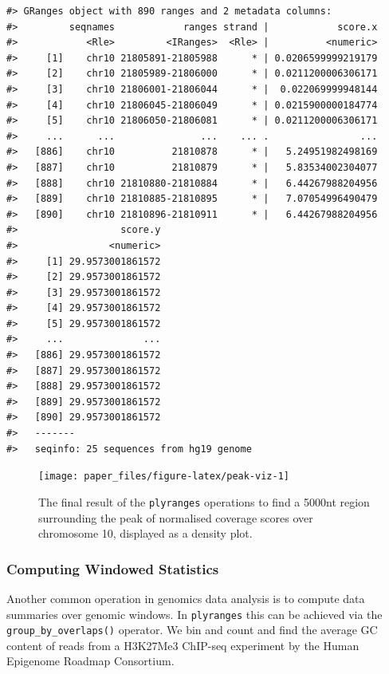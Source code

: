 \documentclass[]{article}
\begin{document}
\begin{verbatim}
#> GRanges object with 890 ranges and 2 metadata columns:
#>         seqnames            ranges strand |            score.x
#>            <Rle>         <IRanges>  <Rle> |          <numeric>
#>     [1]    chr10 21805891-21805988      * | 0.0206599999219179
#>     [2]    chr10 21805989-21806000      * | 0.0211200006306171
#>     [3]    chr10 21806001-21806044      * |  0.022069999948144
#>     [4]    chr10 21806045-21806049      * | 0.0215900000184774
#>     [5]    chr10 21806050-21806081      * | 0.0211200006306171
#>     ...      ...               ...    ... .                ...
#>   [886]    chr10          21810878      * |   5.24951982498169
#>   [887]    chr10          21810879      * |   5.83534002304077
#>   [888]    chr10 21810880-21810884      * |   6.44267988204956
#>   [889]    chr10 21810885-21810895      * |   7.07054996490479
#>   [890]    chr10 21810896-21810911      * |   6.44267988204956
#>                  score.y
#>                <numeric>
#>     [1] 29.9573001861572
#>     [2] 29.9573001861572
#>     [3] 29.9573001861572
#>     [4] 29.9573001861572
#>     [5] 29.9573001861572
#>     ...              ...
#>   [886] 29.9573001861572
#>   [887] 29.9573001861572
#>   [888] 29.9573001861572
#>   [889] 29.9573001861572
#>   [890] 29.9573001861572
#>   -------
#>   seqinfo: 25 sequences from hg19 genome
\end{verbatim}

\begin{figure}

{\centering \texttt{[image: paper\_files/figure-latex/peak-viz-1]} 

}

\caption{The final result of the \texttt{plyranges} operations to find a 5000nt region surrounding the peak of normalised coverage scores over chromosome 10, displayed as a density plot.}\label{fig:peak-viz}
\end{figure}

\subsubsection{Computing Windowed
Statistics}\label{computing-windowed-statistics}

Another common operation in genomics data analysis is to compute data
summaries over genomic windows. In \texttt{plyranges} this can be
achieved via the \texttt{group\_by\_overlaps()} operator. We bin and
count and find the average GC content of reads from a H3K27Me3 ChIP-seq
experiment by the Human Epigenome Roadmap Consortium.
\end{document}
